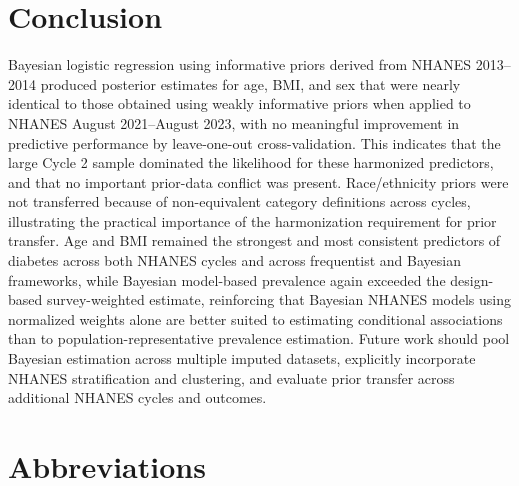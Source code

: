 \documentclass[11pt]{article}
\begin{document}
\section{Conclusion}

Bayesian logistic regression using informative priors derived from
NHANES 2013--2014 produced posterior estimates for age, BMI, and sex that
were nearly identical to those obtained using weakly informative priors when
applied to NHANES August 2021--August 2023, with no meaningful improvement
in predictive performance by leave-one-out cross-validation. This indicates
that the large Cycle 2 sample dominated the likelihood for these
harmonized predictors, and that no important prior-data conflict was
present. Race/ethnicity priors were not transferred because of
non-equivalent category definitions across cycles, illustrating the
practical importance of the harmonization requirement for prior transfer.
Age and BMI remained the strongest and most consistent predictors of
diabetes across both NHANES cycles and across frequentist and Bayesian
frameworks, while Bayesian model-based prevalence again exceeded the
design-based survey-weighted estimate, reinforcing that Bayesian NHANES
models using normalized weights alone are better suited to estimating
conditional associations than to population-representative prevalence
estimation. Future work should pool Bayesian estimation across multiple
imputed datasets, explicitly incorporate NHANES stratification and
clustering, and evaluate prior transfer across additional NHANES cycles
and outcomes.


\section*{Abbreviations}
\end{document}
